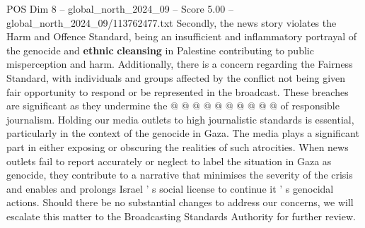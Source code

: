 \begin{textsample}{POS Dim 8 – global\_north\_2024\_09 – Score 5.00 – global\_north\_2024\_09/113762477.txt}
Secondly, the news story violates the Harm and Offence Standard, being an insufficient and inflammatory portrayal of the genocide and \textbf{ethnic} \textbf{cleansing} in Palestine contributing to public misperception and harm.
Additionally, there is a concern regarding the Fairness Standard, with individuals and groups affected by the conflict not being given fair opportunity to respond or be represented in the broadcast.
These breaches are significant as they undermine the @ @ @ @ @ @ @ @ @ @ of responsible journalism.
Holding our media outlets to high journalistic standards is essential, particularly in the context of the genocide in Gaza.
The media plays a significant part in either exposing or obscuring the realities of such atrocities.
When news outlets fail to report accurately or neglect to label the situation in Gaza as genocide, they contribute to a narrative that minimises the severity of the crisis and enables and prolongs Israel ' s social license to continue it ' s genocidal actions.
Should there be no substantial changes to address our concerns, we will escalate this matter to the Broadcasting Standards Authority for further review.

\end{textsample}
